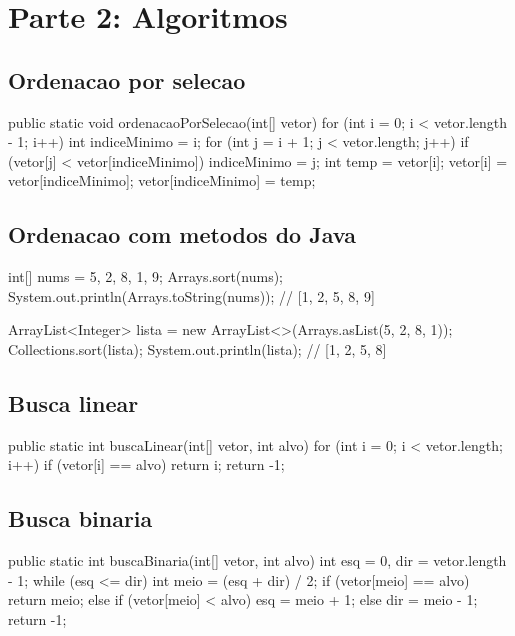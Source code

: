\documentclass[11pt,a4paper]{article}
\begin{document}
\section{Parte 2: Algoritmos}

\subsection{Ordenacao por selecao}

\begin{javacode}
public static void ordenacaoPorSelecao(int[] vetor) {
    for (int i = 0; i < vetor.length - 1; i++) {
        int indiceMinimo = i;
        for (int j = i + 1; j < vetor.length; j++) {
            if (vetor[j] < vetor[indiceMinimo]) indiceMinimo = j;
        }
        int temp = vetor[i];
        vetor[i] = vetor[indiceMinimo];
        vetor[indiceMinimo] = temp;
    }
}
\end{javacode}

\subsection{Ordenacao com metodos do Java}

\begin{javacode}
int[] nums = {5, 2, 8, 1, 9};
Arrays.sort(nums);
System.out.println(Arrays.toString(nums)); // [1, 2, 5, 8, 9]

ArrayList<Integer> lista = new ArrayList<>(Arrays.asList(5, 2, 8, 1));
Collections.sort(lista);
System.out.println(lista); // [1, 2, 5, 8]
\end{javacode}

\subsection{Busca linear}

\begin{javacode}
public static int buscaLinear(int[] vetor, int alvo) {
    for (int i = 0; i < vetor.length; i++) {
        if (vetor[i] == alvo) return i;
    }
    return -1;
}
\end{javacode}

\subsection{Busca binaria}

\begin{javacode}
public static int buscaBinaria(int[] vetor, int alvo) {
    int esq = 0, dir = vetor.length - 1;
    while (esq <= dir) {
        int meio = (esq + dir) / 2;
        if (vetor[meio] == alvo)      return meio;
        else if (vetor[meio] < alvo)  esq = meio + 1;
        else                          dir = meio - 1;
    }
    return -1;
}
\end{javacode}
\end{document}
